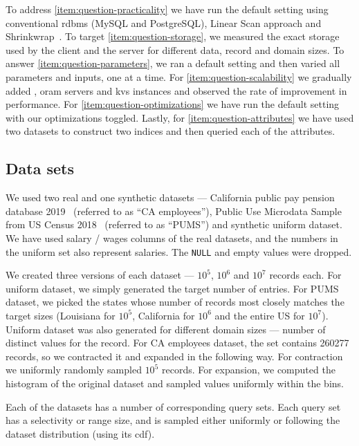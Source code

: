 	To address \ref{item:question-practicality} we have run the default setting using conventional \acrshort{rdbms} (MySQL and PostgreSQL), Linear Scan approach and Shrinkwrap~\cite{shrinkwrap}. %
	To target \ref{item:question-storage}, we measured the exact storage used by the client and the server for different data, record and domain sizes. %
	To answer \ref{item:question-parameters}, we ran a default setting and then varied all parameters and inputs, one at a time. %
	For \ref{item:question-scalability} we gradually added , \acrshort{oram} servers and \acrshort{kvs} instances and observed the rate of improvement in performance. %
	For \ref{item:question-optimizations} we have run the default setting with our optimizations toggled. %
	Lastly, for \ref{item:question-attributes} we have used two datasets to construct two indices and then queried each of the attributes. %

	\subsection{Data sets}\label{section:range-persistent:experiments:data-sets}

		We used two real and one synthetic datasets --- California public pay pension database 2019~\cite{ca-employees-dataset} (referred to as ``CA employees''), Public Use Microdata Sample from US Census 2018~\cite{pums-dataset} (referred to as ``PUMS'') and synthetic uniform dataset.
		We have used salary / wages columns of the real datasets, and the numbers in the uniform set also represent salaries.
		The \texttt{NULL} and empty values were dropped.

		We created three versions of each dataset --- $10^5$, $10^6$ and $10^7$ records each.
		For uniform dataset, we simply generated the target number of entries.
		For PUMS dataset, we picked the states whose number of records most closely matches the target sizes (Louisiana for $10^5$, California for $10^6$ and the entire US for $10^7$).
		Uniform dataset was also generated for different domain sizes --- number of distinct values for the record.
		For CA employees dataset, the set contains \num{260 277} records, so we contracted it and expanded in the following way.
		For contraction we uniformly randomly sampled $10^5$ records.
		For expansion, we computed the histogram of the original dataset and sampled values uniformly within the bins.

		Each of the datasets has a number of corresponding query sets.
		Each query set has a selectivity or range size, and is sampled either uniformly or following the dataset distribution (using its \acrshort{cdf}).

